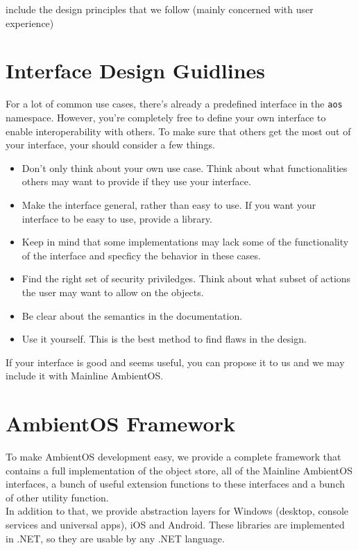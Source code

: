 \documentclass[a4paper]{article}
\begin{document}
{\q include the design principles that we follow (mainly concerned with user experience)}


\section{Interface Design Guidlines} \label{sec:if-guide}

For a lot of common use cases, there's already a predefined interface in the {\tt aos} namespace. However, you're completely free to define your own interface to enable interoperability with others. To make sure that others get the most out of your interface, your should consider a few things.

\begin{itemize}
  \item Don't only think about your own use case. Think about what functionalities others may want to provide if they use your interface.
  \item Make the interface general, rather than easy to use. If you want your interface to be easy to use, provide a library.
  \item Keep in mind that some implementations may lack some of the functionality of the interface and specficy the behavior in these cases.
  \item Find the right set of security priviledges. Think about what subset of actions the user may want to allow on the objects.
  \item Be clear about the semantics in the documentation.
  \item Use it yourself. This is the best method to find flaws in the design.
\end{itemize}

If your interface is good and seems useful, you can propose it to us and we may include it with Mainline AmbientOS.



\section{AmbientOS Framework}

To make AmbientOS development easy, we provide a complete framework that contains a full implementation of the object store, all of the Mainline AmbientOS interfaces, a bunch of useful extension functions to these interfaces and a bunch of other utility function. \\
In addition to that, we provide abstraction layers for Windows (desktop, console services and universal apps), iOS and Android. These libraries are implemented in .NET, so they are usable by any .NET language. \\
\end{document}
